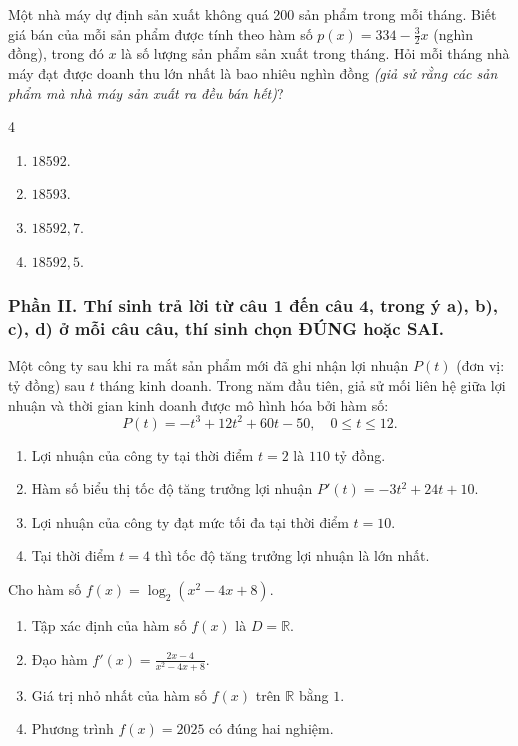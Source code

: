 \begin{baitap}
	Một nhà máy dự định sản xuất không quá 200 sản phẩm trong mỗi tháng. Biết giá bán của mỗi sản phẩm được tính theo hàm số $p(x) = 334 - \frac{3}{2}x$ (nghìn đồng), trong đó $x$ là số lượng sản phẩm sản xuất trong tháng. Hỏi mỗi tháng nhà máy đạt được doanh thu lớn nhất là bao nhiêu nghìn đồng \textit{(giả sử rằng các sản phẩm mà nhà máy sản xuất ra đều bán hết)}?
	\begin{multicols}{4}
		\begin{enumerate}
			\item $18592$.
			\item $18593$.
			\item $18592{,}7$.
			\item $18592{,}5$.
		\end{enumerate}
	\end{multicols}
\end{baitap}
\subsubsection*{Phần II. Thí sinh trả lời từ câu 1 đến câu 4, trong ý a), b), c), d) ở mỗi câu câu, thí sinh chọn ĐÚNG hoặc SAI.}
\setcounter{bt}{0}
\begin{baitap}
	Một công ty sau khi ra mắt sản phẩm mới đã ghi nhận lợi nhuận $P(t)$ (đơn vị: tỷ đồng) sau $t$ tháng kinh doanh. Trong năm đầu tiên, giả sử mối liên hệ giữa lợi nhuận và thời gian kinh doanh được mô hình hóa bởi hàm số:
	\[
	P(t) = -t^3 + 12t^2 + 60t - 50, \quad 0 \le t \le 12.
	\]
	\begin{enumerate}
		\item Lợi nhuận của công ty tại thời điểm $t = 2$ là $110$ tỷ đồng.
		\item Hàm số biểu thị tốc độ tăng trưởng lợi nhuận $P'(t) = -3t^2 + 24t + 10$.
		\item Lợi nhuận của công ty đạt mức tối đa tại thời điểm $t = 10$.
		\item Tại thời điểm $t = 4$ thì tốc độ tăng trưởng lợi nhuận là lớn nhất.
	\end{enumerate}
\end{baitap}

\begin{baitap}
	Cho hàm số $f(x) = \log_2(x^2 - 4x + 8)$.
	\begin{enumerate}
		\item Tập xác định của hàm số $f(x)$ là $D = \mathbb{R}$.
		\item Đạo hàm $f'(x) = \frac{2x - 4}{x^2 - 4x + 8}$.
		\item Giá trị nhỏ nhất của hàm số $f(x)$ trên $\mathbb{R}$ bằng $1$.
		\item Phương trình $f(x) = 2025$ có đúng hai nghiệm.
	\end{enumerate}
\end{baitap}

